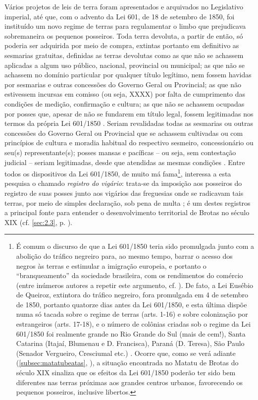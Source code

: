 Vários projetos de leis de terra foram apresentados e arquivados no Legislativo imperial, até que, com o advento da Lei 601, de 18 de setembro de 1850, foi instituído um novo regime de terras para regulamentar o limbo que prejudicava sobremaneira os pequenos posseiros. Toda terra devoluta, a partir de então, só poderia ser adquirida por meio de compra, extintas portanto em definitivo as sesmarias gratuitas, definidas as terras devolutas como as que não se achassem aplicadas a algum uso público, nacional, provincial ou municipal; as que não se achassem no domínio particular por qualquer título legítimo, nem fossem havidas por sesmarias e outras concessões do Governo Geral ou Provincial; as que não estivessem incursas em comisso (ou seja, XXXX) por falta de cumprimento das condições de medição, confirmação e cultura; as que não se achassem ocupadas por posses que, apesar de não se fundarem em título legal, fossem legitimadas nos termos da própria Lei 601/1850 \cite[p.~53]{sodero_diragrario_1990}. Seriam revalidadas todas as sesmarias ou outras concessões do Governo Geral ou Provincial que se achassem cultivadas ou com princípios de cultura e moradia habitual do respectivo sesmeiro, concessionário ou seu(s) representante(s); posses mansas e pacíficas -- ou seja, sem contestação judicial -- seriam legitimadas, desde que atendidas as mesmas condições \cite[p.~54-55]{sodero_diragrario_1990}. Entre todos os dispositivos da Lei 601/1850, de muito má fama\footnote{É comum o discurso de que a Lei 601/1850 teria sido promulgada junto com a abolição do tráfico negreiro para, ao mesmo tempo, barrar o acesso dos negros às terras e estimular a imigração europeia, e portanto o ``branqueamento'' da sociedade brasileira, com os rendimentos do comércio (entre inúmeros autores a repetir este argumento, cf. ). De fato, a Lei Eusébio de Queiroz, extintora do tráfico negreiro, fora promulgada em 4 de setembro de 1850, portanto quatorze dias antes da Lei 601/1850, e esta última dispõe numa só tacada sobre o regime de terras (arts. 1-16) e sobre colonização por estrangeiros (arts. 17-18), e o número de colônias criadas sob o regime da Lei 601/1850 foi realmente grande no Rio Grande do Sul (mais de cem!), Santa Catarina (Itajaí, Blumenau e D. Francisca), Paraná (D. Teresa), São Paulo (Senador Vergueiro, Cresciumal etc.) \cite[p.~58]{sodero_diragrario_1990}. Ocorre que, como se verá adiante (\autoref{subsec:matatubeatas}, \pageref{subsec:matatubeatas}), a situação encontrada no Matatu de Brotas do século XIX sinaliza que os efeitos da Lei 601/1850 poderão ter sido bem diferentes nas terras próximas aos grandes centros urbanos, favorecendo os pequenos posseiros, inclusive libertos.}, interessa a esta pesquisa o chamado \textit{registro do vigário}: trata-se da imposição aos posseiros do registro de suas posses junto aos vigários das freguesias onde se radicavam tais terras, por meio de simples declaração, sob pena de multa \cite[pp.~55-56]{sodero_diragrario_1990}; é um destes registros a principal fonte para entender o desenvolvimento territorial de Brotas no século XIX (cf. \autoref{sec:2.3}, p. \pageref{sec:2.3}). 

